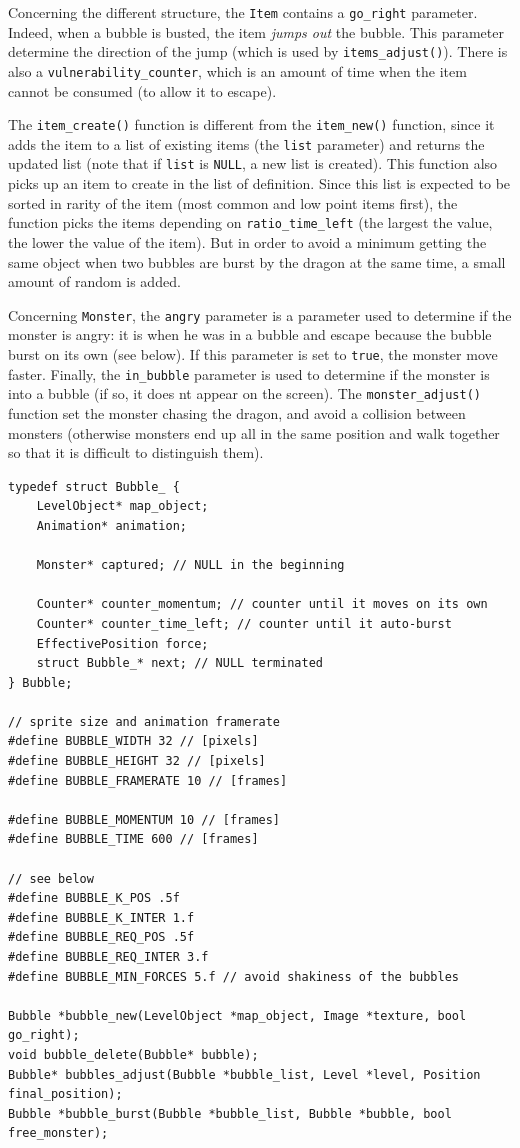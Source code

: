 \documentclass[12pt,a4paper]{article}
\newcommand{\cc}[1]{\texttt{#1}}
\begin{document}
Concerning the different structure, the \cc{Item} contains a \cc{go_right} parameter. Indeed, when a bubble is busted, the item \textit{jumps out} the bubble. This parameter determine the direction of the jump (which is used by \cc{items_adjust()}). There is also a \cc{vulnerability_counter}, which is an amount of time when the item cannot be consumed (to allow it to escape).

The \cc{item_create()} function is different from the \cc{item_new()} function, since it adds the item to a list of existing items (the \cc{list} parameter) and returns the updated list (note that if \cc{list} is \cc{NULL}, a new list is created). This function also picks up an item to create in the list of definition. Since this list is expected to be sorted in rarity of the item (most common and low point items first), the function picks the items depending on \cc{ratio_time_left} (the largest the value, the lower the value of the item). But in order to avoid a minimum getting the same object when two bubbles are burst by the dragon at the same time, a small amount of random is added.

Concerning \cc{Monster}, the \cc{angry} parameter is a parameter used to determine if the monster is angry: it is when he was in a bubble and escape because the bubble burst on its own (see below). If this parameter is set to \cc{true}, the monster move faster. Finally, the \cc{in_bubble} parameter is used to determine if the monster is into a bubble (if so, it does nt appear on the screen). The \cc{monster_adjust()} function set the monster chasing the dragon, and avoid a collision between monsters (otherwise monsters end up all in the same position and walk together so that it is difficult to distinguish them).

\begin{verbatim}
typedef struct Bubble_ {
    LevelObject* map_object;
    Animation* animation;

    Monster* captured; // NULL in the beginning

    Counter* counter_momentum; // counter until it moves on its own
    Counter* counter_time_left; // counter until it auto-burst
    EffectivePosition force;
    struct Bubble_* next; // NULL terminated
} Bubble;

// sprite size and animation framerate
#define BUBBLE_WIDTH 32 // [pixels]
#define BUBBLE_HEIGHT 32 // [pixels]
#define BUBBLE_FRAMERATE 10 // [frames]

#define BUBBLE_MOMENTUM 10 // [frames]
#define BUBBLE_TIME 600 // [frames]

// see below
#define BUBBLE_K_POS .5f
#define BUBBLE_K_INTER 1.f
#define BUBBLE_REQ_POS .5f
#define BUBBLE_REQ_INTER 3.f
#define BUBBLE_MIN_FORCES 5.f // avoid shakiness of the bubbles

Bubble *bubble_new(LevelObject *map_object, Image *texture, bool go_right);
void bubble_delete(Bubble* bubble);
Bubble* bubbles_adjust(Bubble *bubble_list, Level *level, Position final_position);
Bubble *bubble_burst(Bubble *bubble_list, Bubble *bubble, bool free_monster);
\end{verbatim}
\end{document}
